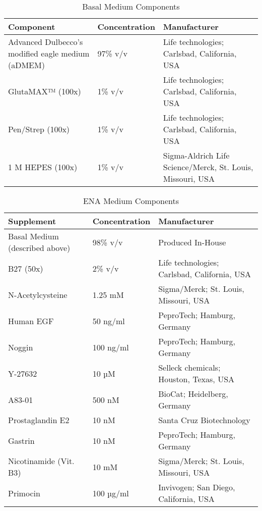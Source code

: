 \begin{flushleft}
\begin{table}[htbp]
\caption{Basal Medium Components}
\label{tab:basal_medium_components}
\begin{tabularx}{\textwidth}{Xll}
\toprule
\textbf{Component} &  \textbf{Concentration} & \textbf{Manufacturer} \\
\midrule
Advanced Dulbecco’s modified eagle medium (aDMEM) & 97\% v/v & Life technologies; Carlsbad, California, USA \\
GlutaMAX™ (100x) & 1\% v/v & Life technologies; Carlsbad, California, USA \\
Pen/Strep (100x) & 1\% v/v & Life technologies; Carlsbad, California, USA \\
1 M HEPES (100x) & 1\% v/v & Sigma-Aldrich Life Science/Merck, St. Louis, Missouri, USA \\
\bottomrule
\end{tabularx}
\end{table}

\begin{table}[htbp]
\caption{ENA Medium Components}
\label{tab:ena_medium_supplements}
\begin{tabularx}{\textwidth}{Xll}
\toprule
\textbf{Supplement} & \textbf{Concentration} & \textbf{Manufacturer} \\
\midrule
Basal Medium (described above) & 98\% v/v & Produced In-House \\
B27 (50x) & 2\% v/v & Life technologies; Carlsbad, California, USA \\
N-Acetylcysteine & 1.25 mM & Sigma/Merck; St. Louis, Missouri, USA \\
Human EGF & 50 ng/ml & PeproTech; Hamburg, Germany \\
Noggin & 100 ng/ml & PeproTech; Hamburg, Germany \\
Y-27632 & 10 µM & Selleck chemicals; Houston, Texas, USA \\
A83-01 & 500 nM & BioCat; Heidelberg, Germany \\
Prostaglandin E2 & 10 nM & Santa Cruz Biotechnology \\
Gastrin & 10 nM & PeproTech; Hamburg, Germany \\
Nicotinamide (Vit. B3) & 10 mM & Sigma/Merck; St. Louis, Missouri, USA \\
Primocin & 100 µg/ml & Invivogen; San Diego, California, USA \\
\bottomrule
\end{tabularx}
\end{table}






\end{flushleft}
